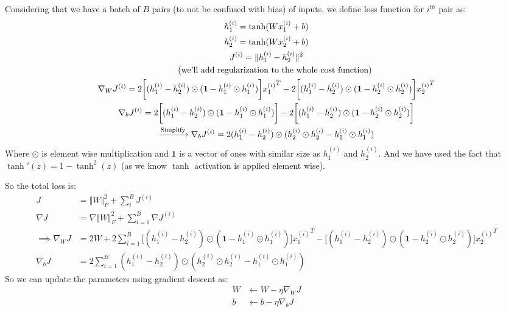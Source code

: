 \documentclass[]{article}
\numberwithin{equation}{section}
\newcommand{\norm}[2][]{\Vert #2\Vert_{#1}}
\newcommand{\transpose}{^T}
\begin{document}
\subsection{}
Considering that we have a batch of \(B\) pairs (to not be confused with bias) of inputs, we define loss function for \(i^{th}\) pair as:
\begin{gather}
h_1^{(i)} = \tanh(Wx_1^{(i)} + b)\\
h_2^{(i)} = \tanh(Wx_2^{(i)} + b)\\
J^{(i)} = \norm{h_1^{(i)} - h_2^{(i)}}^2\\
\tag{\textup{we'll add regularization to the whole cost function}}\\
\nabla_W J^{(i)} = 2\biggl[(h_1^{(i)} - h_2^{(i)}) \odot (\mathbf{1} - h_1^{(i)} \odot h_1^{(i)})\biggr] {x_1^{(i)}}\transpose - 2\biggl[(h_1^{(i)} - h_2^{(i)}) \odot (\mathbf{1} - h_2^{(i)} \odot h_2^{(i)})\biggr] {x_2^{(i)}}\transpose\\
\nabla_b J^{(i)} = 2\biggl[(h_1^{(i)} - h_2^{(i)}) \odot (\mathbf{1} - h_1^{(i)} \odot h_1^{(i)})\biggr] - 2\biggl[(h_1^{(i)} - h_2^{(i)}) \odot (\mathbf{1} - h_2^{(i)} \odot h_2^{(i)})\biggr]\\
\xrightarrow{\textup{Simplify}} \nabla_b J^{(i)} = 2(h_1^{(i)} - h_2^{(i)}) \odot (h_2^{(i)} \odot h_2^{(i)} - h_1^{(i)} \odot h_1^{(i)})
\end{gather}
Where \(\odot\) is element wise multiplication and \(\mathbf{1}\) is a vector of ones with similar size as \(h_1^{(i)}\) and \(h_2^{(i)}\).
And we have used the fact that \(\tanh'(z) = 1 - \tanh^2(z)\) (as we know \(\tanh\) activation is applied element wise).

So the total loss is:
\begin{align}
J &= \norm[F]{W}^2 + \sum_{i}^B J^{(i)}\\
\nabla J &= \nabla \norm[F]{W}^2 + \sum_{i=1}^B \nabla J^{(i)}\\
\implies \nabla_W J &= 2W + 2 \sum_{i=1}^B \biggl[(h_1^{(i)} - h_2^{(i)}) \odot (\mathbf{1} - h_1^{(i)} \odot h_1^{(i)})\biggr] {x_1^{(i)}}\transpose - \biggl[(h_1^{(i)} - h_2^{(i)}) \odot (\mathbf{1} - h_2^{(i)} \odot h_2^{(i)})\biggr] {x_2^{(i)}}\transpose\\
\nabla_b J &= 2 \sum_{i=1}^B (h_1^{(i)} - h_2^{(i)}) \odot (h_2^{(i)} \odot h_2^{(i)} - h_1^{(i)} \odot h_1^{(i)})
\end{align}
So we can update the parameters using gradient descent as:
\begin{align}
W &\leftarrow W - \eta \nabla_W J\\
b &\leftarrow b - \eta \nabla_b J
\end{align}
\end{document}
